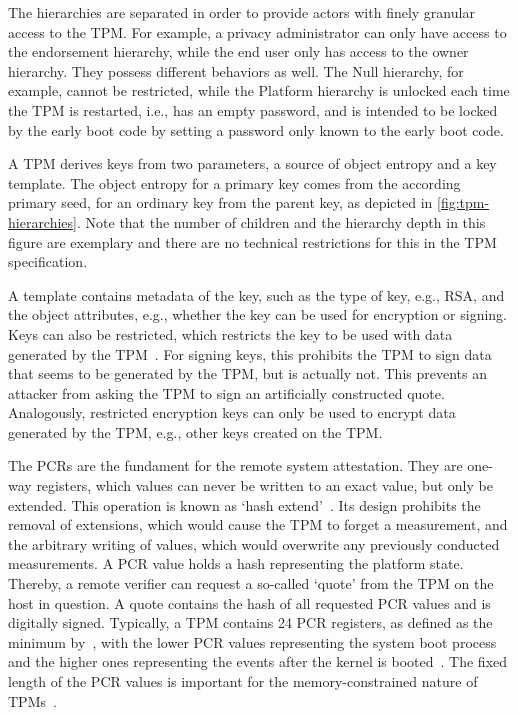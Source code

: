 The hierarchies are separated in order to provide actors with finely granular access to the TPM\@.
For example, a privacy administrator can only have access to the endorsement hierarchy, while the end user only has access to the owner hierarchy.
They possess different behaviors as well.
The Null hierarchy, for example, cannot be restricted, while the Platform hierarchy is unlocked each time the TPM is restarted, i.e., has an empty password, and is intended to be locked by the early boot code by setting a password only known to the early boot code.



A TPM derives keys from two parameters, a source of object entropy and a key template.
The object entropy for a primary key comes from the according primary seed, for an ordinary key from the parent key, as depicted in \autoref{fig:tpm-hierarchies}.
Note that the number of children and the hierarchy depth in this figure are exemplary and there are no technical restrictions for this in the TPM specification.

A template contains metadata of the key, such as the type of key, e.g., RSA, and the object attributes, e.g., whether the key can be used for encryption or signing.
Keys can also be restricted, which restricts the key to be used with data generated by the TPM~\cite{tpm}.
For signing keys, this prohibits the TPM to sign data that seems to be generated by the TPM, but is actually not.
This prevents an attacker from asking the TPM to sign an artificially constructed quote.
Analogously, restricted encryption keys can only be used to encrypt data generated by the TPM, e.g., other keys created on the TPM\@.


The \acp{PCR} are the fundament for the remote system attestation. They are one-way registers, which values can never be written to an exact value, but only be extended.
This operation is known as `hash extend'~\cite{Arthur2015}.
Its design prohibits the removal of extensions, which would cause the TPM to forget a measurement, and the arbitrary writing of values, which would overwrite any previously conducted measurements.
A PCR value holds a hash representing the platform state.
Thereby, a remote verifier can request a so-called `quote' from the TPM on the host in question.
A quote contains the hash of all requested PCR values and is digitally signed.
Typically, a TPM contains 24 PCR registers, as defined as the minimum by~\cite{tcgPcClient}, with the lower PCR values representing the system boot process and the higher ones representing the events after the kernel is booted~\cite{Arthur2015}.
The fixed length of the \ac{PCR} values is important for the memory-constrained nature of TPMs~\cite{Arthur2015}.

